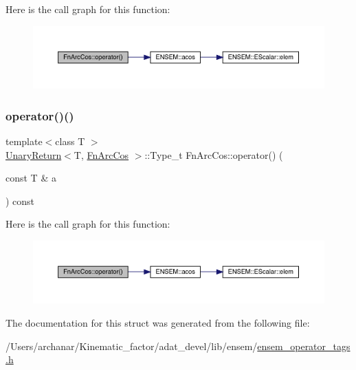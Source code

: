 Here is the call graph for this function\+:
\nopagebreak
\begin{figure}[H]
\begin{center}
\leavevmode
\includegraphics[width=350pt]{d1/d0b/structFnArcCos_a1485eed840820589bafab9b8cc21c43d_cgraph}
\end{center}
\end{figure}
\mbox{\label{structFnArcCos_a1485eed840820589bafab9b8cc21c43d}} 
\subsubsection{\texorpdfstring{operator()()}{operator()()}\hspace{0.1cm}{\footnotesize\ttfamily [2/2]}}
{\footnotesize\ttfamily template$<$class T $>$ \\
\mbox{\hyperlink{structUnaryReturn}{Unary\+Return}}$<$T, \mbox{\hyperlink{structFnArcCos}{Fn\+Arc\+Cos}} $>$\+::Type\+\_\+t Fn\+Arc\+Cos\+::operator() (\begin{DoxyParamCaption}\item[{const T \&}]{a }\end{DoxyParamCaption}) const\hspace{0.3cm}{\ttfamily [inline]}}

Here is the call graph for this function\+:
\nopagebreak
\begin{figure}[H]
\begin{center}
\leavevmode
\includegraphics[width=350pt]{d1/d0b/structFnArcCos_a1485eed840820589bafab9b8cc21c43d_cgraph}
\end{center}
\end{figure}


The documentation for this struct was generated from the following file\+:\begin{DoxyCompactItemize}
\item 
/\+Users/archanar/\+Kinematic\+\_\+factor/adat\+\_\+devel/lib/ensem/\mbox{\hyperlink{lib_2ensem_2ensem__operator__tags_8h}{ensem\+\_\+operator\+\_\+tags.\+h}}\end{DoxyCompactItemize}
